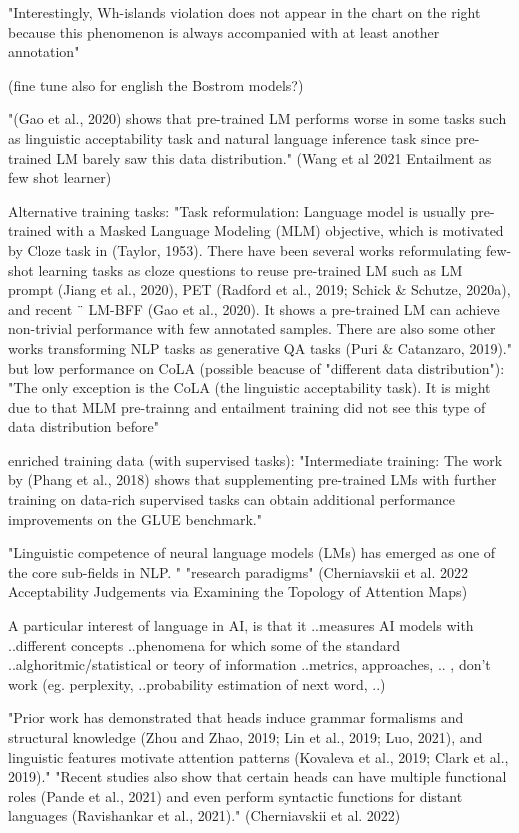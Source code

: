 "Interestingly, Wh-islands violation
does not appear in the chart on the right because
this phenomenon is always accompanied with at
least another annotation"


(fine tune also for english the Bostrom models?)

"(Gao et al., 2020) shows that pre-trained LM performs worse in some tasks such
as linguistic acceptability task and natural language inference task since pre-trained LM barely saw
this data distribution." (Wang et al 2021 Entailment as few shot learner)

Alternative training tasks:
"Task reformulation: Language model is usually pre-trained with a Masked Language Modeling
(MLM) objective, which is motivated by Cloze task in (Taylor, 1953). There have been several
works reformulating few-shot learning tasks as cloze questions to reuse pre-trained LM such as
LM prompt (Jiang et al., 2020), PET (Radford et al., 2019; Schick \& Schutze, 2020a), and recent ¨
LM-BFF (Gao et al., 2020). It shows a pre-trained LM can achieve non-trivial performance with few annotated samples. There are also some other works transforming NLP tasks as generative QA tasks (Puri \& Catanzaro, 2019)."
but low performance on CoLA (possible beacuse of "different data distribution"):
"The only exception is the CoLA (the linguistic acceptability task). It
is might due to that MLM pre-trainng and entailment training did not see this type of data distribution before"

enriched training data (with supervised tasks):
"Intermediate training: The work by (Phang et al., 2018) shows that supplementing pre-trained LMs with further training on data-rich supervised tasks can obtain additional performance improvements on the GLUE benchmark."

"Linguistic competence of neural language models (LMs) has emerged as one of the core sub-fields in NLP. " "research paradigms" (Cherniavskii et al. 2022 Acceptability Judgements via Examining the Topology of Attention Maps)

A particular interest of language in AI, is that it ..measures AI models with ..different concepts ..phenomena for which some of the standard ..alghoritmic/statistical or teory of information ..metrics, approaches, .. , don't work (eg. perplexity, ..probability estimation of next word, ..)

"Prior work has demonstrated that heads
induce grammar formalisms and structural knowledge (Zhou and Zhao, 2019; Lin et al., 2019; Luo,
2021), and linguistic features motivate attention
patterns (Kovaleva et al., 2019; Clark et al., 2019)."
"Recent studies also show that certain heads can
have multiple functional roles (Pande et al., 2021)
and even perform syntactic functions for distant
languages (Ravishankar et al., 2021)."
(Cherniavskii et al. 2022)

